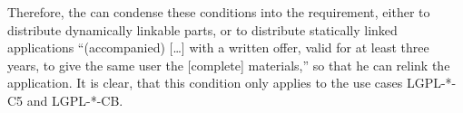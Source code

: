 \begin{itemize}
  Therefore, the \oslic{} can condense these conditions into the requirement,
  either to distribute dynamically linkable parts, or to distribute statically
  linked applications \enquote{(accompanied) [\ldots] with a written offer,
  valid for at least three years, to give the same user the [complete]
  materials,} so that he can relink the application. It is
  clear, that this condition only applies to the use cases LGPL-*-C5 and
  LGPL-*-CB. 
  
\end{itemize}

%

